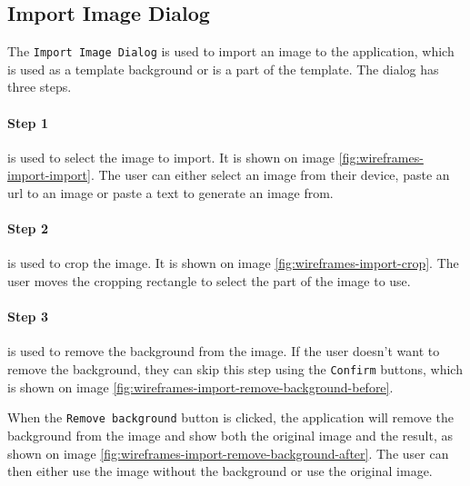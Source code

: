 \subsection{Import Image Dialog}
\label{sec:import-image-dialog}

The \texttt{Import Image Dialog} is used to import an image to the application, which is used as a template background or is a part of the template. The dialog has three steps.

\paragraph*{Step 1} is used to select the image to import. It is shown on image \ref{fig:wireframes-import-import}. The user can either select an image from their device, paste an \acrshort{url} to an image or paste a text to generate an image from.

\paragraph*{Step 2} is used to crop the image. It is shown on image \ref{fig:wireframes-import-crop}. The user moves the cropping rectangle to select the part of the image to use.

\paragraph*{Step 3} is used to remove the background from the image. If the user doesn't want to remove the background, they can skip this step using the \texttt{Confirm} buttons, which is shown on image \ref{fig:wireframes-import-remove-background-before}.

When the \texttt{Remove background} button is clicked, the application will remove the background from the image and show both the original image and the result, as shown on image \ref{fig:wireframes-import-remove-background-after}. The user can then either use the image without the background or use the original image.

